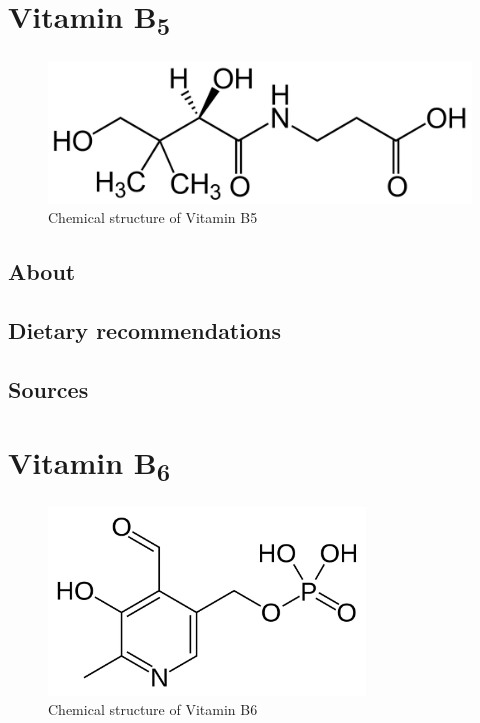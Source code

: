 \documentclass{book}
\begin{document}
\chapter{Vitamin B\textsubscript{5}}
\begin{figure}[h]
	\caption{Chemical structure of Vitamin B5}
	\centering \includegraphics[width=\textwidth]{images/Vitamin_B5_chemical_structure}
\end{figure}
\newpage

\section{About}


\section{Dietary recommendations}


\section{Sources}


\chapter{Vitamin B\textsubscript{6}}
\begin{figure}[h]
	\caption{Chemical structure of Vitamin B6}
	\centering \includegraphics[width=0.75\textwidth]{images/Vitamin_B6_chemical_structure}
\end{figure}
\newpage
\end{document}
